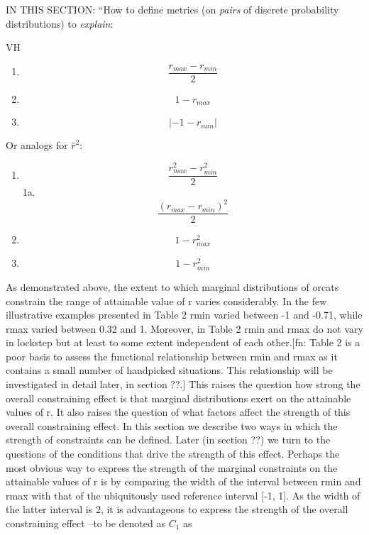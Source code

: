 \documentclass[
  12pt,
]{article}
\providecommand{\tightlist}{%
  \setlength{\itemsep}{0pt}\setlength{\parskip}{0pt}}
\theoremstyle{plain}
\theoremstyle{definition}
\theoremstyle{remark}
\begin{document}
IN THIS SECTION: ``How to define metrics (on \emph{pairs} of discrete
probability distributions) to \emph{explain}:

VH

\begin{enumerate}
\def\labelenumi{\arabic{enumi}.}
\tightlist
\item
  \[\frac{ r_{max}-r_{min}}{2}\]
\item
  \[1-r_{max}\]
\item
  \[|-1-r_{min}|\]
\end{enumerate}

Or analogs for \(\hat{r}^2\):

\begin{enumerate}
\def\labelenumi{\arabic{enumi}.}
\tightlist
\item
  \[\frac{ r_{max}^2-r_{min}^2}{2}\] 1a.
  \[\frac{ (r_{max}-r_{min})^2}{2}\]
\item
  \[1-r_{max}^2\]
\item
  \[1-r_{min}^2\]
\end{enumerate}

As demonstrated above, the extent to which marginal distributions of
orcats constrain the range of attainable value of r varies considerably.
In the few illustrative examples presented in Table 2 rmin varied
between -1 and -0.71, while rmax varied between 0.32 and 1. Moreover, in
Table 2 rmin and rmax do not vary in lockstep but at least to some
extent independent of each other.{[}fn: Table 2 is a poor basis to
assess the functional relationship between rmin and rmax as it contains
a small number of handpicked situations. This relationship will be
investigated in detail later, in section ??.{]} This raises the question
how strong the overall constraining effect is that marginal
distributions exert on the attainable values of r. It also raises the
question of what factors affect the strength of this overall
constraining effect. In this section we describe two ways in which the
strength of constraints can be defined. Later (in section ??) we turn to
the questions of the conditions that drive the strength of this effect.
Perhaps the most obvious way to express the strength of the marginal
constraints on the attainable values of r is by comparing the width of
the interval between rmin and rmax with that of the ubiquitously used
reference interval {[}-1, 1{]}. As the width of the latter interval is
2, it is advantageous to express the strength of the overall
constraining effect --to be denoted as \(C_1\) as
\end{document}
